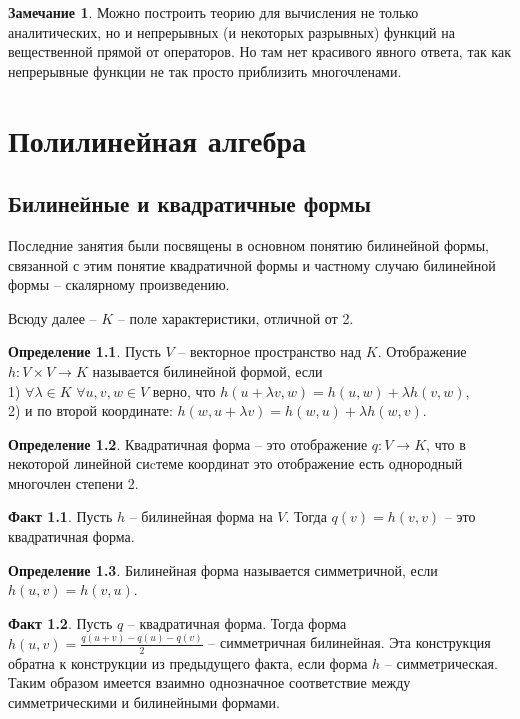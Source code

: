 \documentclass[10pt,a4paper,oneside]{book}
\theoremstyle{definition}
\newtheorem*{rem}{Замечание}
\newtheorem{defn}{Определение}
\newtheorem*{fact}{Факт}
\def\dfn{\begin{defn}}
\def\edfn{\end{defn}}
\def\fct{\begin{fact}}
\def\efct{\end{fact}}
\begin{document}
\begin{rem}
Можно построить теорию для вычисления не только аналитических, но и непрерывных (и некоторых разрывных) функций на вещественной прямой от операторов. Но там нет красивого явного ответа, так как непрерывные функции не так просто приблизить многочленами.
\end{rem}











\chapter{Полилинейная алгебра}

\section{Билинейные и квадратичные формы}

Последние занятия были посвящены в основном понятию билинейной формы, связанной с этим понятие квадратичной формы и частному случаю билинейной формы -- скалярному произведению.

Всюду далее -- $K$ -- поле характеристики, отличной от 2.

\dfn Пусть $V$ -- векторное пространство над $K$. Отображение $h\colon V\times V \to K$ называется билинейной формой, если\\
1) $\forall \lambda \in K$ $\forall u,v,w \in V$ верно, что $h(u+\lambda v, w) = h(u,w)+\lambda h(v,w)$,\\
2) и по второй координате: $h( w, u+\lambda v) = h(w,u)+\lambda h(w,v)$.
\edfn

\dfn Квадратичная форма -- это отображение $q\colon V \to K$, что в некоторой линейной сиcтеме координат это отображение есть однородный многочлен степени 2.
\edfn

\fct Пусть $h$ -- билинейная форма на $V$. Тогда $q(v)=h(v,v)$ -- это квадратичная форма.
\efct

\dfn Билинейная форма называется симметричной, если $h(u,v)=h(v,u)$.
\edfn

\fct
Пусть $q$ -- квадратичная форма. Тогда форма $h(u,v)=\frac{q(u+v)-q(u)-q(v)}{2}$ -- симметричная билинейная. Эта конструкция обратна к конструкции из предыдущего факта, если форма $h$ -- симметрическая. Таким образом имеется взаимно однозначное соответствие между симметрическими и билинейными формами.
\efct 
\end{document}
